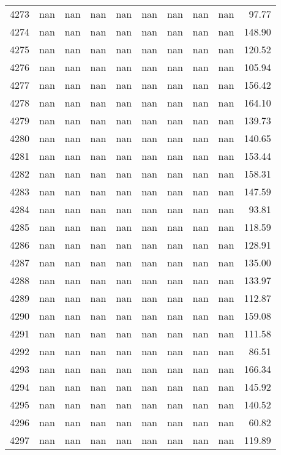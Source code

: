 \begin{tabular}{lrrrrrrrrr}
4273 & nan & nan & nan & nan & nan & nan & nan & nan & 97.77 \\
4274 & nan & nan & nan & nan & nan & nan & nan & nan & 148.90 \\
4275 & nan & nan & nan & nan & nan & nan & nan & nan & 120.52 \\
4276 & nan & nan & nan & nan & nan & nan & nan & nan & 105.94 \\
4277 & nan & nan & nan & nan & nan & nan & nan & nan & 156.42 \\
4278 & nan & nan & nan & nan & nan & nan & nan & nan & 164.10 \\
4279 & nan & nan & nan & nan & nan & nan & nan & nan & 139.73 \\
4280 & nan & nan & nan & nan & nan & nan & nan & nan & 140.65 \\
4281 & nan & nan & nan & nan & nan & nan & nan & nan & 153.44 \\
4282 & nan & nan & nan & nan & nan & nan & nan & nan & 158.31 \\
4283 & nan & nan & nan & nan & nan & nan & nan & nan & 147.59 \\
4284 & nan & nan & nan & nan & nan & nan & nan & nan & 93.81 \\
4285 & nan & nan & nan & nan & nan & nan & nan & nan & 118.59 \\
4286 & nan & nan & nan & nan & nan & nan & nan & nan & 128.91 \\
4287 & nan & nan & nan & nan & nan & nan & nan & nan & 135.00 \\
4288 & nan & nan & nan & nan & nan & nan & nan & nan & 133.97 \\
4289 & nan & nan & nan & nan & nan & nan & nan & nan & 112.87 \\
4290 & nan & nan & nan & nan & nan & nan & nan & nan & 159.08 \\
4291 & nan & nan & nan & nan & nan & nan & nan & nan & 111.58 \\
4292 & nan & nan & nan & nan & nan & nan & nan & nan & 86.51 \\
4293 & nan & nan & nan & nan & nan & nan & nan & nan & 166.34 \\
4294 & nan & nan & nan & nan & nan & nan & nan & nan & 145.92 \\
4295 & nan & nan & nan & nan & nan & nan & nan & nan & 140.52 \\
4296 & nan & nan & nan & nan & nan & nan & nan & nan & 60.82 \\
4297 & nan & nan & nan & nan & nan & nan & nan & nan & 119.89 \\

\end{tabular}
